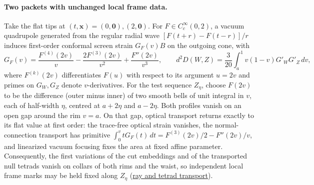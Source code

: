 \documentclass[10pt,a4paper]{article}
\numberwithin{equation}{section}
\newcommand{\repo}[2]{\href{https://github.com/sprajs/quantum-gravity/blob/main/#1}{#2}}
\begin{document}
\paragraph{Two packets with unchanged local frame data.}
Take the flat tips at $(t,\mathbf x)=(0,\mathbf0),(2,\mathbf0)$. For $F\in C_c^\infty(0,2)$, a vacuum quadrupole generated from the regular radial wave $[F(t+r)-F(t-r)]/r$ induces first-order conformal screen strain $G_F(v)B$ on the outgoing cone, with
\begin{equation}
 G_F(v)=\frac{F^{(4)}(2v)}{v}-\frac{2F^{(3)}(2v)}{v^2}+\frac{F''(2v)}{v^3},
 \qquad d^2D(W,Z)=\frac3{20}\int_a^1 v(1-v)G'_W G'_Z\,dv ,
 \label{eq:packet-hessian}
\end{equation}
where $F^{(k)}(2v)$ differentiates $F(u)$ with respect to its argument $u=2v$ and primes on $G_W,G_Z$ denote $v$-derivatives. For the test sequence $Z_\eta$, choose $F(2v)$ to be the difference (outer minus inner) of two smooth bells of unit integral in $v$, each of half-width $\eta$, centred at $a+2\eta$ and $a-2\eta$. Both profiles vanish on an open gap around the rim $v=a$. On that gap, optical transport returns exactly to its flat value at first order: the trace-free optical strain vanishes, the normal-connection transport has primitive $\int_0^v tG_F(t)\,dt=F^{(3)}(2v)/2-F''(2v)/v$, and linearized vacuum focusing fixes the area at fixed affine parameter. Consequently, the first variations of the cut embeddings and of the transported null tetrads vanish on collars of both rims and the waist, so independent local frame marks may be held fixed along $Z_\eta$ (\repo{audit/match-packets.md}{ray and tetrad transport}).
\end{document}
